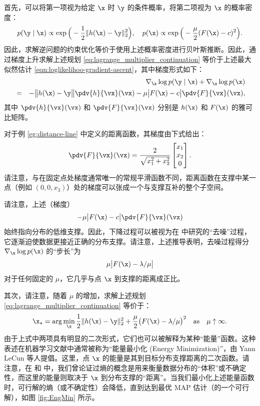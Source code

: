 \documentclass[../../book-main_zh.tex]{subfiles}
\begin{document}
首先，可以将第一项视为给定 $\x$ 时 $\y$ 的条件概率，将第二项视为 $\x$ 的概率密度：
\begin{equation}
    p(\y\mid \x) \propto \exp\Big(- \frac{1}{2}\|h(\x) - \y\|_2^2\Big), \quad
    p(\x) \propto \exp\Big( - \frac{\mu}{2}(F(\x) - c)^2\Big).
\end{equation}
因此，求解逆问题的约束优化等价于使用上述概率密度进行贝叶斯推断。因此，通过梯度上升求解上述规划 \eqref{eq:lagrange_multiplier_continuation} 等价于上述最大似然估计 \eqref{eqn:loglikelihoo-gradient-ascent}，其中梯度形式如下：
\begin{eqnarray}
    && \nabla_{\x} \log p(\y \mid \x) + \nabla_{\x} \log p(\x)  \\
    &=&  - \big\|h(\x) - \y\big\| \pdv{h}{\vx}(\vx) -  \mu \big|
    F(\x) - c \big| \pdv{F}{\vx}(\vx), \label{eqn:EngMin-gradient}
\end{eqnarray}
其中 $\pdv{h}{\vx}(\vx)$ 和 $\pdv{F}{\vx}(\vx)$ 分别是 $h(\x)$ 和 $F(\x)$ 的雅可比矩阵。
\begin{example}[$F(\x)$ 的梯度] 对于例 \ref{eg:distance-line} 中定义的距离函数，其梯度由下式给出：
    \begin{equation}
        \pdv{F}{\vx}(\vx) =  \frac{2}{\sqrt{x_1^2 + x_2^2}}\left[
            \begin{matrix}
                x_1 \\ x_2 \\ 0
        \end{matrix}\right].
    \end{equation}
    请注意，与在固定点处梯度通常唯一的常规平滑函数不同，距离函数在支撑中某一点（例如 $(0, 0, x_3)$）处的梯度可以张成一个与支撑互补的整个子空间。
\end{example}

请注意，上述（梯度）
$$-  \mu \big| F(\x) - c \big| \pdv{F}{\vx}(\vx)$$ 始终指向分布的低维支撑。因此，下降过程可以被视为在  中研究的“去噪”过程，它逐渐迫使数据更接近正确的分布支撑。请注意，上述推导表明，去噪过程得分 $\nabla_{\x}
\log p(\x)$ 的“步长”为 $$\mu \big| F(\x) -
\lambda/\mu\big|$$ 对于任何固定的 $\mu$，它几乎与点 $\x$ 到支撑的距离成正比。

其次，请注意，随着 $\mu$ 的增加，求解上述规划 \eqref{eq:lagrange_multiplier_continuation} 等价于：
\begin{equation}
    \x_\star = \arg\min_{\x} \frac{1}{2}\|h(\x) - \y\|_2^2 +
    \frac{\mu}{2} \big(F(\x) - \lambda/\mu\big)^2 \quad \mbox{as}
    \quad \mu \uparrow \infty.
    \label{eqn:energy-minimization}
\end{equation}
由于上式中两项具有明显的二次形式，它们也可以被解释为某种“能量”函数。这种表述在机器学习文献中通常被称为“能量最小化 (Energy Minimization)”，由 Yann LeCun \cite{LeCun-2006} 等人提倡。这里，点 $\x$ 的能量是其到目标分布支撑距离的二次函数。请注意，在  和  中，我们曾论证过熵的概念是用来衡量数据分布的“体积”或不确定性，而这里的能量则取决于 $\x$ 到分布支撑的“距离”。当我们最小化上述能量函数时，可行解的熵（或不确定性）会降低，直到达到最优 MAP 估计（的一个可行解），如图 \ref{fig:EngMin} 所示。
\end{document}
